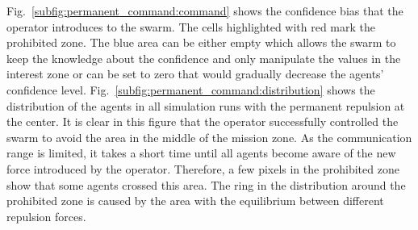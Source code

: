 \documentclass[runningheads]{llncs}%
\begin{document}
Fig.~\ref{subfig:permanent_command:command} shows the confidence bias that the operator introduces to the swarm. The cells highlighted with red mark the prohibited zone. The blue area can be either empty which allows the swarm to keep the knowledge about the confidence and only manipulate the values in the interest zone or {can be set to zero that would gradually decrease the agents' confidence level.} Fig.~\ref{subfig:permanent_command:distribution} shows the distribution of the agents in all simulation runs with the permanent repulsion at the center. It is clear in this figure that the operator successfully controlled the swarm to avoid the area in the middle of the mission zone. As the communication range is limited, it takes a short time until all agents become aware of the new force introduced by the operator. Therefore, a few pixels in the prohibited zone show that some agents crossed this area. The ring in the distribution around the prohibited zone is caused by the area with the equilibrium between different repulsion forces.  
\end{document}
